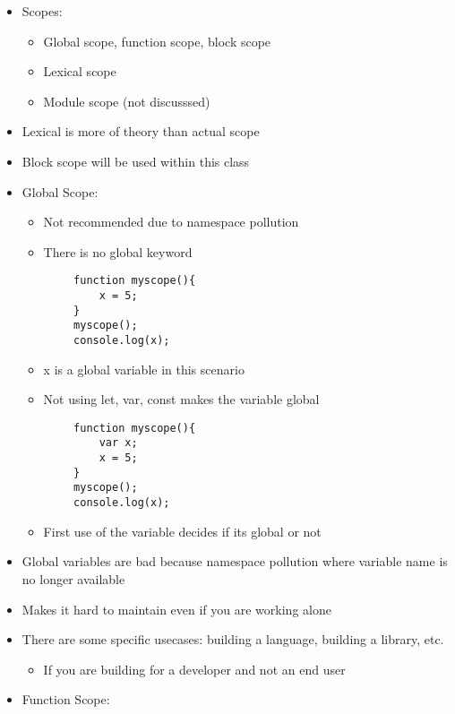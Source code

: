 \documentclass{article}
\begin{document}
\begin{itemize}
    \item Scopes:
    \begin{itemize}
        \item Global scope, function scope, block scope
        \item Lexical scope 
        \item Module scope (not discusssed)
    \end{itemize}
    \item Lexical is more of theory than actual scope
    \item Block scope will be used within this class
    \item Global Scope:
    \begin{itemize}
        \item Not recommended due to namespace pollution
        \item There is no global keyword
    \end{itemize}
    \begin{lstlisting}
        function myscope(){
            x = 5;
        }
        myscope();
        console.log(x);
    \end{lstlisting}
    \begin{itemize}
        \item x is a global variable in this scenario
        \item Not using let, var, const makes the variable global
    \end{itemize}
    \begin{lstlisting}
        function myscope(){
            var x;
            x = 5;
        }
        myscope();
        console.log(x);
    \end{lstlisting}
    \begin{itemize}
        \item First use of the variable decides if its global or not
    \end{itemize}
    \item Global variables are bad because namespace pollution where variable name is no longer available
    \item Makes it hard to maintain even if you are working alone
    \item There are some specific usecases: building a language, building a library, etc.
    \begin{itemize}
        \item If you are building for a developer and not an end user
    \end{itemize}
    \item Function Scope:

\end{itemize}
\end{document}
